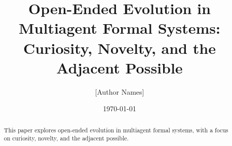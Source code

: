 \documentclass{article}
\title{Open-Ended Evolution in Multiagent Formal Systems: Curiosity, Novelty, and the Adjacent Possible}
\author{[Author Names]}
\date{\today}
\begin{document}
\maketitle

\begin{abstract}
This paper explores open-ended evolution in multiagent formal systems, with a focus on curiosity, novelty, and the adjacent possible.
\end{abstract}











\end{document}
